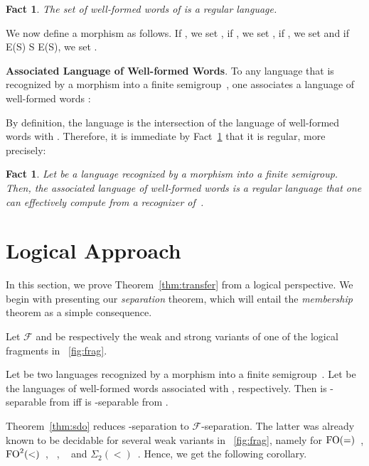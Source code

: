 \documentclass[a4paper,USenglish]{lipics}
\newcommand\Fs{\ensuremath{\mathcal{F}}\xspace}
\newcommand{\sio}[1]{\ensuremath{\Sigma_{#1}(<)}\xspace}
\newcommand{\sdo}{\sio{2}}
\newcommand{\foeq}{\ensuremath{\textup{FO}(=)}\xspace}
\newcommand{\fod}{\ensuremath{\textup{FO}^2(<)}\xspace}
\newcommand\highlight[1]{\par\bigskip\noindent\textbf{\sffamily #1}.}
\theoremstyle{plain}
\newtheorem{fact}[theorem]{Fact}
\begin{document}
\begin{fact} \label{fct:reg}
  The set of well-formed words of  is a regular language.
\end{fact}

We now define a morphism  as follows. If , we set , if
, we set , if , we set  and if E(S) \times
  S \times E(S), we set .


\highlight{Associated Language of Well-formed Words} To any
language  that is recognized by a morphism  into a
finite semigroup~, one
associates a language of well-formed words :

By definition, the language  is the intersection
of the language of well-formed words with . Therefore,
it is immediate by Fact~\ref{fct:reg} that it is regular, more precisely:

\begin{fact} \label{fct:reg2} Let  be a language recognized
  by a morphism  into a finite semigroup. Then, the associated
  language of well-formed words  is a regular language
  that one can effectively compute from a recognizer of~.
\end{fact}


\section{Logical Approach}
\label{sec:special}
In this section, we prove Theorem~\ref{thm:transfer} from a logical
perspective. We begin with presenting our \emph{separation} theorem, which
will entail the \emph{membership} theorem as a simple consequence.

\begin{theorem} \label{thm:sdo}
  Let \Fs and  be respectively the weak and strong variants of
  one of the logical fragments in \figurename~\ref{fig:frag}.

  Let  be two languages recognized by a morphism  into a finite semigroup~. Let  be the languages of well-formed words associated
  with , respectively. Then  is -separable from 
  iff\/  is -separable from .
\end{theorem}

Theorem~\ref{thm:sdo} reduces -separation to \Fs-separation. The latter
was already known to be decidable for several weak variants in
\figurename~\ref{fig:frag}, namely for \foeq~\cite{ltltt:2013},
\fod~\cite{DBLP:conf/mfcs/PlaceRZ13}, ~\cite{sep_icalp13},
~\cite{sep_icalp13,DBLP:conf/mfcs/PlaceRZ13} and
\sdo~\cite{PZ:icalp14}. Hence, we get the following corollary.
\end{document}
